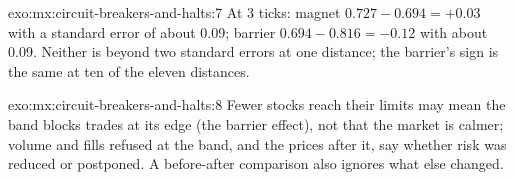 \begin{solution}{exo:mx:circuit-breakers-and-halts:7}
At 3 ticks: magnet $0.727-0.694=+0.03$ with a standard error of about 0.09; barrier $0.694-0.816=-0.12$ with about 0.09. Neither is beyond two
standard errors at one distance; the barrier's sign is the same at ten of the eleven distances.
\end{solution}

\begin{solution}{exo:mx:circuit-breakers-and-halts:8}
Fewer stocks reach their limits may mean the band blocks trades at its edge (the barrier effect), not that the market is calmer; volume and fills refused
at the band, and the prices after it, say whether risk was reduced or postponed. A before-after comparison also ignores what else changed.
\end{solution}

